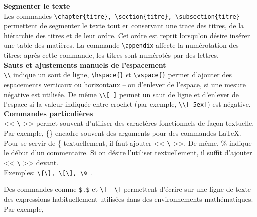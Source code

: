 \documentclass[12pt]{article}
\begin{document}
	\textbf{Segmenter le texte} \\
	Les commandes \lstinline|\chapter{titre}, \section{titre}, \subsection{titre}| permettent de segmenter le texte tout en conservant une trace des titres, de la hiérarchie des titres et de leur ordre. Cet ordre est reprit lorsqu'on désire insérer une table des matières. La commande \lstinline|\appendix| affecte la numérotation des titres: après cette commande, les titres sont numérotés par des lettres. \\
	
	\textbf{Sauts et ajustements manuels de l'espacement} \\
	\lstinline|\\| indique un saut de ligne, \lstinline|\hspace{}| et \lstinline|\vspace{}| permet d'ajouter des espacements verticaux ou horizontaux -- ou d'enlever de l'espace, si une mesure négative est utilisée. De même \lstinline|\\[ ]| permet un saut de ligne et d'enlever de l'espace si la valeur indiquée entre crochet (par exemple, \lstinline|\\[-5ex]|) est négative. \\
	
	\textbf{Commandes particulières} \\
	<< \lstinline|\| >> permet souvent d'utiliser des caractères fonctionnels de façon textuelle. Par exemple, \{\} encadre souvent des arguments pour des commandes LaTeX. Pour se servir de \{ textuellement, il faut ajouter << \lstinline|\| >>. De même, \% indique le début d'un commentaire. Si on désire l'utiliser textuellement, il suffit d'ajouter << \lstinline|\| >> devant. \\
	
	Exemples: \lstinline|\{\}, \[\], \% |.
	
	Des commandes comme \lstinline|$.$| et \lstinline|\[  \]| permettent d'écrire sur une ligne de texte des expressions habituellement utilisées dans des environnements mathématiques. Par exemple,
	
\end{document}
